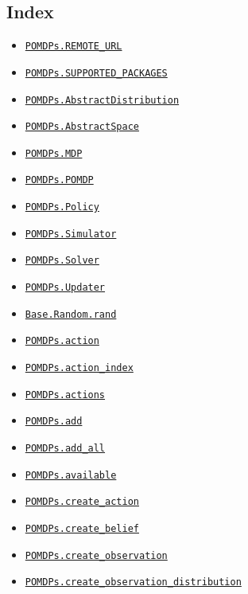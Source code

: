 \documentclass[12pt,]{article}
\providecommand{\tightlist}{%
  \setlength{\itemsep}{0pt}\setlength{\parskip}{0pt}}
\begin{document}
\subsection{Index}\label{index}

\begin{itemize}
\tightlist
\item
  \href{api.md\#POMDPs.REMOTE_URL}{\texttt{POMDPs.REMOTE\_URL}}
\item
  \href{api.md\#POMDPs.SUPPORTED_PACKAGES}{\texttt{POMDPs.SUPPORTED\_PACKAGES}}
\item
  \href{api.md\#POMDPs.AbstractDistribution}{\texttt{POMDPs.AbstractDistribution}}
\item
  \href{api.md\#POMDPs.AbstractSpace}{\texttt{POMDPs.AbstractSpace}}
\item
  \href{api.md\#POMDPs.MDP}{\texttt{POMDPs.MDP}}
\item
  \href{api.md\#POMDPs.POMDP}{\texttt{POMDPs.POMDP}}
\item
  \href{api.md\#POMDPs.Policy}{\texttt{POMDPs.Policy}}
\item
  \href{api.md\#POMDPs.Simulator}{\texttt{POMDPs.Simulator}}
\item
  \href{api.md\#POMDPs.Solver}{\texttt{POMDPs.Solver}}
\item
  \href{api.md\#POMDPs.Updater}{\texttt{POMDPs.Updater}}
\item
  \href{api.md\#Base.Random.rand}{\texttt{Base.Random.rand}}
\item
  \href{api.md\#POMDPs.action}{\texttt{POMDPs.action}}
\item
  \href{api.md\#POMDPs.action_index}{\texttt{POMDPs.action\_index}}
\item
  \href{api.md\#POMDPs.actions}{\texttt{POMDPs.actions}}
\item
  \href{api.md\#POMDPs.add}{\texttt{POMDPs.add}}
\item
  \href{api.md\#POMDPs.add_all}{\texttt{POMDPs.add\_all}}
\item
  \href{api.md\#POMDPs.available}{\texttt{POMDPs.available}}
\item
  \href{api.md\#POMDPs.create_action}{\texttt{POMDPs.create\_action}}
\item
  \href{api.md\#POMDPs.create_belief}{\texttt{POMDPs.create\_belief}}
\item
  \href{api.md\#POMDPs.create_observation}{\texttt{POMDPs.create\_observation}}
\item
  \href{api.md\#POMDPs.create_observation_distribution}{\texttt{POMDPs.create\_observation\_distribution}}

\end{itemize}
\end{document}
